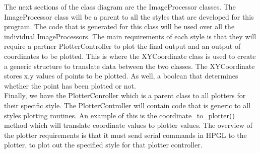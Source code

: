 \documentclass{article}
\begin{document}
The next sections of the class diagram are the ImageProcessor classes. The ImageProcessor class will be a parent to all the styles that are developed for this program. The code that is generated for this class will be used over all the individual ImageProcessors. The main requirements of each style is that they will require a partner PlotterController to plot the final output and an output of coordinates to be plotted. This is where the XYCoordinate class is used to create a generic structure to translate data between the two classes. The XYCoordinate stores x,y values of points to be plotted. As well, a boolean that determines whether the point has been plotted or not.\\ \newline
Finally, we have the PlotterConroller which is a parent class to all plotters for their specific style. The PlotterController will contain code that is generic to all styles plotting routines. An example of this is the coordinate\_to\_plotter() method which will translate coordinate values to plotter values. The overview of the plotter requirements is that it must send serial commands in HPGL to the plotter, to plot out the specified style for that plotter controller.
\\ \newline
\end{document}
